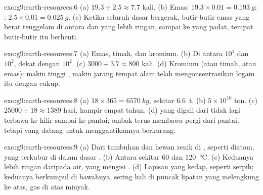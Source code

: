 \begin{solution}{exo:g9:earth-resources:6}
(a) $19.3 \div 2.5 \approx 7.7$ kali. (b) Emas: $19.3 \times 0.01 =
\qty{0.193}{g}$; : $2.5 \times 0.01 = \qty{0.025}{g}$. (c) Ketika
seluruh dasar  bergerak, butir-butir emas yang berat tenggelam di
antara  dan  yang lebih ringan, sampai ke  yang
padat, tempat butir-butir itu berhenti.
\end{solution}

\begin{solution}{exo:g9:earth-resources:7}
(a) Emas, timah, dan kromium. (b) Di antara $10^1$ dan $10^2$, dekat
dengan $10^2$. (c) $3000 \div 3.7 \approx 800$ kali. (d) Kromium (atau
timah, atau emas): makin tinggi , makin jarang
tempat alam telah mengonsentrasikan logam itu dengan cukup.
\end{solution}

\begin{solution}{exo:g9:earth-resources:8}
(a) $18 \times 365 = \qty{6570}{kg}$, sekitar \qty{6.6}{t}. (b) $5 \times
10^{10}$ ton. (c) $25000 \div 18 \approx 1389$ hari, hampir empat tahun.
(d)  yang digali dari  tidak lagi terbawa ke hilir sampai ke
pantai; ombak terus membawa  pergi dari pantai, tetapi  yang
datang untuk menggantikannya berkurang.
\end{solution}

\begin{solution}{exo:g9:earth-resources:9}
(a) Dari tumbuhan dan hewan renik di , seperti diatom, yang terkubur
di dalam  dasar . (b) Antara sekitar 60 dan
\qty{120}{\degreeCelsius}. (c) Keduanya lebih ringan daripada air, yang
mengisi  . (d) Lapisan yang kedap, seperti serpih; keduanya
berkumpul di bawahnya, sering kali di puncak lipatan yang melengkung ke
atas, gas di atas minyak.
\end{solution}

